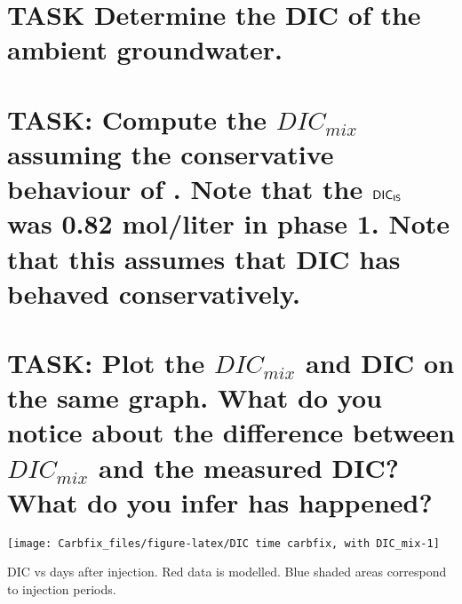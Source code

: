 \documentclass[nofonts,x11names]{tufte-handout}
\begin{document}
\section{TASK Determine the DIC of the ambient
groundwater.}\label{task-determine-the-dic-of-the-ambient-groundwater.}


\section{\texorpdfstring{TASK: Compute the \(DIC_{mix}\) assuming the
conservative behaviour of . Note that the \(\sf DIC_{IS}\) was
0.82 mol/liter in phase 1. Note that this assumes that DIC has behaved
conservatively.}{TASK: Compute the DIC\_\{mix\} assuming the conservative behaviour of . Note that the \textbackslash sf DIC\_\{IS\} was 0.82 mol/liter in phase 1. Note that this assumes that DIC has behaved conservatively.}}\label{task-compute-the-dic_mix-assuming-the-conservative-behaviour-of-.-note-that-the-sf-dic_is-was-0.82-molliter-in-phase-1.-note-that-this-assumes-that-dic-has-behaved-conservatively.}


\section{\texorpdfstring{TASK: Plot the \(DIC_{mix}\) and DIC on the
same graph. What do you notice about the difference between
\(DIC_{mix}\) and the measured DIC? What do you infer has
happened?}{TASK: Plot the DIC\_\{mix\} and DIC on the same graph. What do you notice about the difference between DIC\_\{mix\} and the measured DIC? What do you infer has happened?}}\label{task-plot-the-dic_mix-and-dic-on-the-same-graph.-what-do-you-notice-about-the-difference-between-dic_mix-and-the-measured-dic-what-do-you-infer-has-happened}

\begin{marginfigure}[0.1cm]
\texttt{[image: Carbfix\_files/figure-latex/DIC time carbfix, with DIC\_mix-1]} \caption[DIC vs days after injection]{DIC vs days after injection. Red data is modelled. Blue shaded areas correspond to injection periods.}\label{fig:DIC time carbfix, with DIC_mix}
\end{marginfigure}
\end{document}
